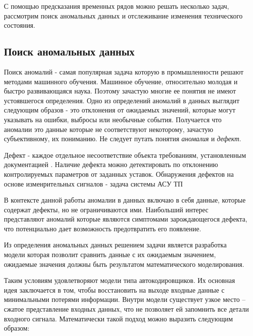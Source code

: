 \documentclass[12pt,a4paper]{article}
\begin{document}
С помощью предсказания временных рядов можно решать несколько задач, рассмотрим поиск аномальных данных и отслеживание изменения технического состояния.

%
%
%
%
%



\subsection{Поиск аномальных данных}

Поиск аномалий - самая популярная задача которую в промышленности решают методами машинного обучения. Машинное обучение, относительно молодая и быстро развивающаяся наука. Поэтому зачастую многие ее понятия не имеют устоявшегося определения. Одно из определений аномалий в данных выглядит следующим образов - это отклонения от ожидаемых значений, которые могут указывать на ошибки, выбросы или необычные события. Получается что аномалии это данные которые не соответствуют некоторому, зачастую субъективному, их пониманию. Не следует путать понятия {\it аномалия} и {\it дефект}.

Дефект - каждое  отдельное несоответствие  объекта  требованиям, установленным документацией \cite{gost_27002}. Наличие дефекта можно детектировать по отклонению контролируемых параметров от заданных уставок.
Обнаружения дефектов на основе изменрительных сигналов - задача системы АСУ ТП

В контексте данной работы аномалии в данных включаю в себя данные, которые содержат дефекты, но не ограничиваются ими. Наибольший интерес представляют аномалий которые  являются симптомами зарождающегося дефекта, что потенциально дает возможность предотвратить его появление.

Из определения аномальных данных решением задачи является разработка модели которая позволит сравнить данные с их ожидаемым значением, ожидаемые значения должны быть результатом математического моделирования.

Таким условиям удовлетворяют модели типа автокодировщиков. Их основная идея заключается в том, чтобы восстановить на выходе входные данные с минимальными потерями информации. Внутри модели существует узкое место – сжатое представление входных данных, что не позволяет ей запомнить все детали входного сигнала. Математически такой подход можно выразить следующим образом:
\end{document}
